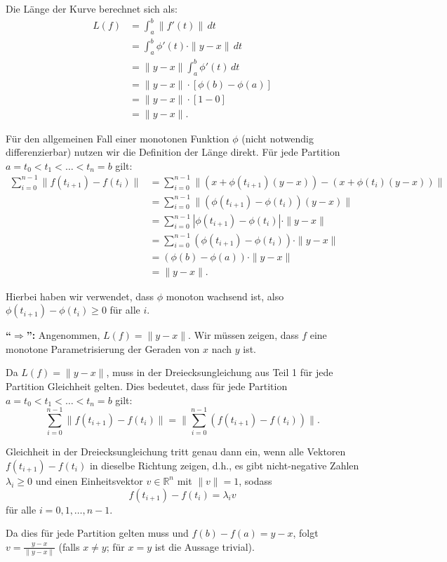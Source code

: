 \documentclass{article}
\newcommand{\R}{\mathbb{R}}
\newcommand{\norm}[1]{\|#1\|}
\begin{document}
Die Länge der Kurve berechnet sich als:
\begin{align}
L(f) &= \int_a^b \norm{f'(t)} \, dt\\
&= \int_a^b \phi'(t) \cdot \norm{y-x} \, dt\\
&= \norm{y-x} \int_a^b \phi'(t) \, dt\\
&= \norm{y-x} \cdot [\phi(b) - \phi(a)]\\
&= \norm{y-x} \cdot [1 - 0]\\
&= \norm{y-x}.
\end{align}

Für den allgemeinen Fall einer monotonen Funktion $\phi$ (nicht notwendig differenzierbar) nutzen wir die Definition der Länge direkt. Für jede Partition $a = t_0 < t_1 < \ldots < t_n = b$ gilt:
\begin{align}
\sum_{i=0}^{n-1} \norm{f(t_{i+1}) - f(t_i)} &= \sum_{i=0}^{n-1} \norm{(x + \phi(t_{i+1})(y-x)) - (x + \phi(t_i)(y-x))}\\
&= \sum_{i=0}^{n-1} \norm{(\phi(t_{i+1}) - \phi(t_i))(y-x)}\\
&= \sum_{i=0}^{n-1} |\phi(t_{i+1}) - \phi(t_i)| \cdot \norm{y-x}\\
&= \sum_{i=0}^{n-1} (\phi(t_{i+1}) - \phi(t_i)) \cdot \norm{y-x}\\
&= (\phi(b) - \phi(a)) \cdot \norm{y-x}\\
&= \norm{y-x}.
\end{align}

Hierbei haben wir verwendet, dass $\phi$ monoton wachsend ist, also $\phi(t_{i+1}) - \phi(t_i) \geq 0$ für alle $i$.

\textbf{``$\Rightarrow$'':} Angenommen, $L(f) = \norm{y-x}$. Wir müssen zeigen, dass $f$ eine monotone Parametrisierung der Geraden von $x$ nach $y$ ist.

Da $L(f) = \norm{y-x}$, muss in der Dreiecksungleichung aus Teil 1 für jede Partition Gleichheit gelten. Dies bedeutet, dass für jede Partition $a = t_0 < t_1 < \ldots < t_n = b$ gilt:
\[
\sum_{i=0}^{n-1} \norm{f(t_{i+1}) - f(t_i)} = \norm{\sum_{i=0}^{n-1} (f(t_{i+1}) - f(t_i))}.
\]

Gleichheit in der Dreiecksungleichung tritt genau dann ein, wenn alle Vektoren $f(t_{i+1}) - f(t_i)$ in dieselbe Richtung zeigen, d.h., es gibt nicht-negative Zahlen $\lambda_i \geq 0$ und einen Einheitsvektor $v \in \R^n$ mit $\norm{v} = 1$, sodass
\[
f(t_{i+1}) - f(t_i) = \lambda_i v
\]
für alle $i = 0, 1, \ldots, n-1$.

Da dies für jede Partition gelten muss und $f(b) - f(a) = y - x$, folgt $v = \frac{y-x}{\norm{y-x}}$ (falls $x \neq y$; für $x = y$ ist die Aussage trivial).
\end{document}

